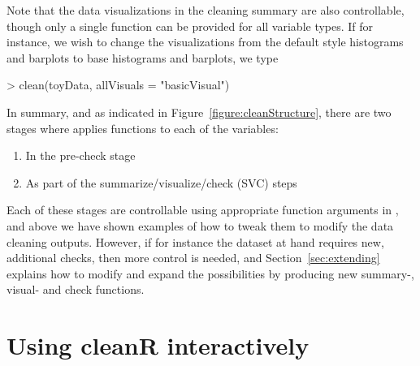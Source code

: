 \documentclass[article,shortnames]{jss}
\newcommand{\hl}[1]{\textcolor{magenta}{#1}}
\newcommand{\R}[1]{\code{#1}}
\begin{document}
Note that the data visualizations in the cleaning summary are also controllable, though only a single function can be provided for all variable types. If for instance, we wish to change the visualizations from the default  style histograms and barplots to base  histograms and barplots, we type
\begin{Schunk}
\begin{Sinput}
> clean(toyData, allVisuals = "basicVisual")
\end{Sinput}
\end{Schunk}







In summary, and as indicated in Figure~\ref{figure:cleanStructure}, there are two stages
where \R{clean()} applies functions to each of the variables: 
\begin{enumerate}
\item In the pre-check stage
\item As part of the summarize/visualize/check (SVC) steps
\end{enumerate}
Each of these stages are controllable using appropriate function
arguments in \R{clean()}, and above we have shown examples of how to
tweak them to modify the data cleaning outputs. However, if for
instance the dataset at hand requires new, additional checks, then more control is needed, and
Section~\ref{sec:extending} explains how to modify and expand the
possibilities by producing new summary-, visual- and check functions.

\section{Using cleanR interactively}
\label{sec:interactiveCleanR}
\end{document}
